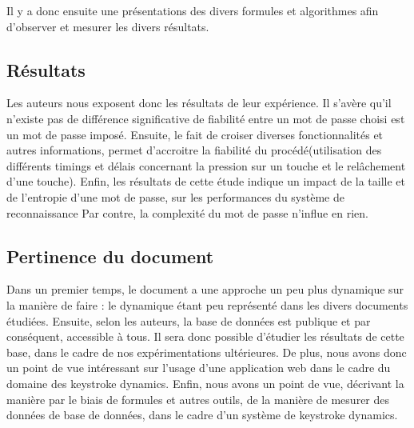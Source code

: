 Il y a donc ensuite une présentations des divers formules et algorithmes afin d'observer et mesurer les divers résultats.

\subsection{Résultats}

	Les auteurs nous exposent donc les résultats de leur expérience. 
Il s'avère qu'il n'existe pas de différence significative de fiabilité entre un mot de passe choisi est un mot de passe imposé.
Ensuite, le fait de croiser diverses fonctionnalités et autres informations, permet d'accroitre la fiabilité du procédé(utilisation des différents timings et délais concernant la pression sur un touche et le relâchement d'une touche).
Enfin, les résultats de cette étude indique un impact de la taille et de l'entropie d'une mot de passe, sur les performances du système de reconnaissance Par contre, la complexité du mot de passe n'influe en rien.


\subsection{Pertinence du document}

	Dans un premier temps, le document a une approche un peu plus dynamique sur la manière de faire : le dynamique étant peu représenté dans les divers documents étudiées. Ensuite, selon les auteurs, la base de données est publique et par conséquent, accessible à tous. Il sera donc possible d'étudier les résultats de cette base, dans le cadre de nos expérimentations ultérieures. De plus, nous avons donc un point de vue intéressant sur l'usage d'une application web dans le cadre du domaine des keystroke dynamics. Enfin, nous avons un point de vue, décrivant la manière par le biais de formules et autres outils, de la manière de mesurer des données de base de données, dans le cadre d'un système de keystroke dynamics.
